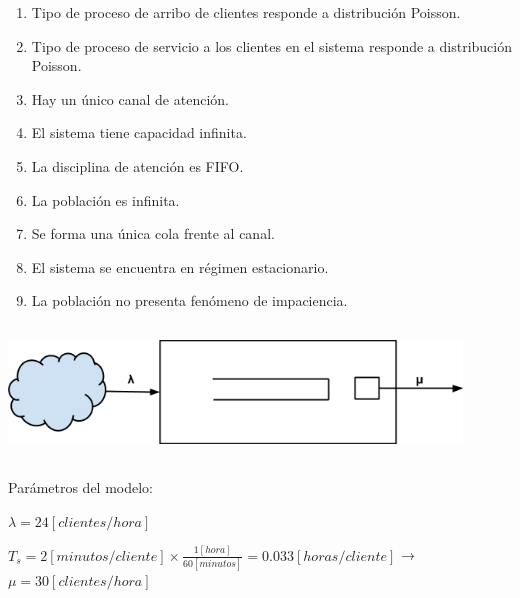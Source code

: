 \documentclass[a4paper,11pt]{article}
\begin{document}
\begin{enumerate}[1.]
  \item Tipo de proceso de arribo de clientes responde a distribución Poisson.
  \item Tipo de proceso de servicio a los clientes en el sistema responde a
    distribución Poisson.
  \item Hay un único canal de atención.
  \item El sistema tiene capacidad infinita.
  \item La disciplina de atención es FIFO.
  \item La población es infinita.
  \item Se forma una única cola frente al canal.
  \item El sistema se encuentra en régimen estacionario.
  \item La población no presenta fenómeno de impaciencia.
\end{enumerate}

\vspace{13pt}
\includegraphics[width=341pt, height=101pt, keepaspectratio=true]{TP1-Colas-fig001.png}

\vspace{27pt}
Parámetros del modelo:

$\lambda = 24 [clientes/hora]$

$T_s = 2 [minutos/cliente] \times \frac{1[hora]}{60[minutos]} = 0.033
[horas/cliente]$ → $\mu = 30 [clientes/hora]$
\end{document}
